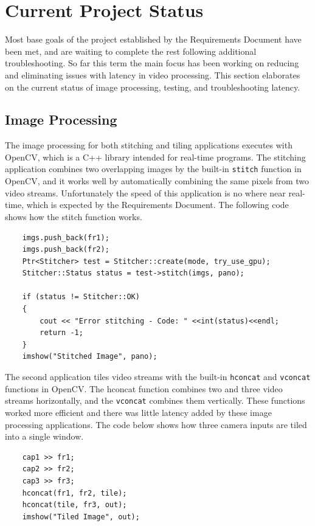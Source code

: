 \documentclass[letterpaper,10pt,serif,draftclsnofoot,onecolumn,compsoc,titlepage]{IEEEtran}
\begin{document}
\section{Current Project Status}

Most base goals of the project established by the Requirements Document have been met, 
and are waiting to complete the rest following additional troubleshooting. So far this term 
the main focus has been working on reducing and eliminating issues with latency in 
video processing. This section elaborates on the current status of image processing, 
testing, and troubleshooting latency. \\

\subsection{Image Processing}

The image processing for both stitching and tiling applications executes with OpenCV, 
which is a C++ library intended for real-time programs. The stitching application 
combines two overlapping images by the built-in 
\texttt{stitch} function in OpenCV, and it works well by automatically combining the same pixels 
from two video streams. Unfortunately the speed of this application is no where near 
real-time, which is expected by the Requirements Document. 
The following code shows how the stitch function works. \\

\begin{lstlisting}
    imgs.push_back(fr1);
    imgs.push_back(fr2);
    Ptr<Stitcher> test = Stitcher::create(mode, try_use_gpu);
    Stitcher::Status status = test->stitch(imgs, pano);

    if (status != Stitcher::OK)
    {
        cout << "Error stitching - Code: " <<int(status)<<endl;
        return -1;
    }
    imshow("Stitched Image", pano);
\end{lstlisting}

The second application tiles video streams with the built-in \texttt{hconcat} and 
\texttt{vconcat} functions in OpenCV. The hconcat function combines two and three 
video streams horizontally, and the \texttt{vconcat} combines them vertically.  
These functions worked more efficient and there was little latency added by these
image processing applications. The code below shows how three camera inputs are tiled 
into a single window. \\

\begin{lstlisting}
    cap1 >> fr1;
    cap2 >> fr2;
    cap3 >> fr3;
    hconcat(fr1, fr2, tile);          
    hconcat(tile, fr3, out);
    imshow("Tiled Image", out);
\end{lstlisting}
\end{document}
